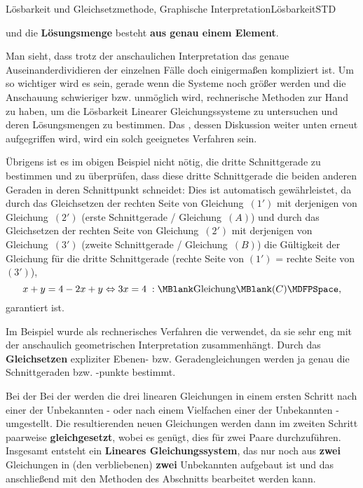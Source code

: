 \begin{MXContent}{Lösbarkeit und Gleichsetzmethode, Graphische Interpretation}{Lösbarkeit}{STD}
\begin{itemize}
{\begin{itemize}
{und die \textbf{Lösungsmenge} besteht \textbf{aus genau einem Element}.}
\end{itemize}}
\end{itemize}
Man sieht, dass trotz der anschaulichen Interpretation das genaue Auseinanderdividieren der einzelnen Fälle doch einigermaßen
kompliziert ist. Um so wichtiger wird es sein, gerade wenn die Systeme noch größer werden und die Anschauung schwieriger
bzw. unmöglich wird, rechnerische Methoden zur Hand zu haben, um die Lösbarkeit Linearer Gleichungssysteme zu
untersuchen und deren Lösungsmengen zu bestimmen. Das , dessen
Diskussion weiter unten erneut aufgegriffen wird, wird ein solch geeignetes Verfahren sein.

Übrigens ist es im obigen Beispiel  nicht nötig, die dritte Schnittgerade zu bestimmen und
zu überprüfen, dass diese dritte Schnittgerade die beiden anderen Geraden in deren Schnittpunkt schneidet: Dies ist
automatisch gewährleistet, da durch das Gleichsetzen der rechten Seite von Gleichung~$(1')$ mit derjenigen von
Gleichung~$(2')$ (erste Schnittgerade / Gleichung~$(A)$) und durch das Gleichsetzen der rechten Seite von
Gleichung~$(2')$ mit derjenigen von Gleichung~$(3')$ (zweite Schnittgerade / Gleichung~$(B)$) die Gültigkeit der
Gleichung für die dritte Schnittgerade (rechte Seite von $(1')$ = rechte Seite von $(3')$),
$$x + y = 4 - 2 x + y \Leftrightarrow 3 x = 4 \; : \MBlank\mbox{Gleichung}\MBlank (C) \MDFPSpace ,$$
garantiert ist.

Im Beispiel wurde als rechnerisches Verfahren die  verwendet, da sie
sehr eng mit der anschaulich geometrischen Interpretation zusammenhängt. Durch das \textbf{Gleichsetzen} expliziter
Ebenen- bzw. Geradengleichungen werden ja genau die Schnittgeraden bzw. -punkte bestimmt.
\begin{MInfo}
Bei der Bei der  werden die drei linearen Gleichungen in einem ersten
Schritt nach einer der Unbekannten - oder nach einem Vielfachen einer der Unbekannten - umgestellt. Die
resultierenden neuen Gleichungen werden dann im zweiten Schritt paarweise \textbf{gleichgesetzt}, wobei es genügt,
dies für zwei Paare durchzuführen. Insgesamt entsteht ein \textbf{Lineares
Gleichungssystem}, das nur noch aus \textbf{zwei} Gleichungen in (den verbliebenen) \textbf{zwei} Unbekannten
aufgebaut ist und das anschließend mit den Methoden des Abschnitts  bearbeitet werden kann.
\end{MInfo}


\end{MXContent}
